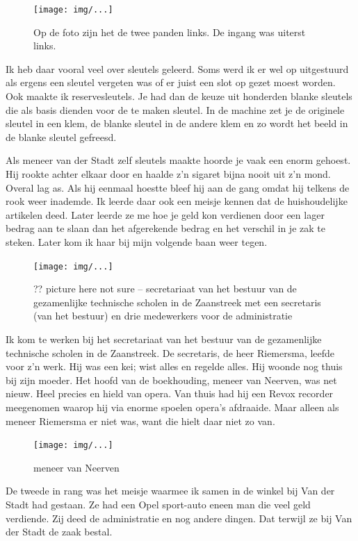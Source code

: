 \documentclass[12pt,twoside, openright]{memoir}
\begin{document}
\begin{figure}[t]
\texttt{[image: img/...]}
\caption{Op de foto zijn het de twee panden links. De ingang was uiterst links.}
\end{figure}

Ik heb daar vooral veel over sleutels geleerd. Soms werd ik er wel op uitgestuurd als ergens een sleutel vergeten was of er juist een slot op gezet moest worden. Ook maakte ik reservesleutels. Je had dan de keuze uit honderden blanke sleutels die als basis dienden voor de te maken sleutel. In de machine zet je de originele sleutel in een klem, de blanke sleutel in de andere klem en zo wordt het beeld in de blanke sleutel gefreesd. 

Als meneer van der Stadt zelf sleutels maakte hoorde je vaak een enorm gehoest. Hij rookte achter elkaar door en haalde z’n sigaret bijna nooit uit z’n mond. Overal lag as. Als hij eenmaal hoestte bleef hij aan de gang omdat hij telkens de rook weer inademde. Ik leerde daar ook een meisje kennen dat de huishoudelijke artikelen deed. Later leerde ze me hoe je geld kon verdienen door een lager bedrag aan te slaan dan het afgerekende bedrag en het verschil in je zak te steken. Later kom ik haar bij mijn volgende baan weer tegen. 

\begin{figure}[t]
\texttt{[image: img/...]}
\caption{?? picture here not sure -- secretariaat van het bestuur van de gezamenlijke technische scholen in de Zaanstreek met een secretaris (van het bestuur) en drie medewerkers voor de administratie}
\end{figure}

Ik kom te werken bij het secretariaat van het bestuur van de gezamenlijke technische scholen in de Zaanstreek. De secretaris, de heer Riemersma, leefde voor z'n werk. Hij was een kei; wist alles en regelde alles. Hij woonde nog thuis bij zijn moeder. Het hoofd van de boekhouding, meneer van Neerven, was net nieuw. Heel precies en hield van opera. Van thuis had hij een Revox recorder meegenomen waarop hij via enorme spoelen opera's afdraaide. Maar alleen als meneer Riemersma er niet was, want die hielt daar niet zo van.

\begin{figure}[t]
\texttt{[image: img/...]}
\caption{meneer van Neerven}
\end{figure}

De tweede in rang was het meisje waarmee ik samen in de winkel bij Van der Stadt had gestaan. Ze had een Opel sport-auto eneen man die veel geld verdiende. Zij deed de administratie en nog andere dingen. Dat terwijl ze bij Van der Stadt de zaak bestal.
\end{document}
